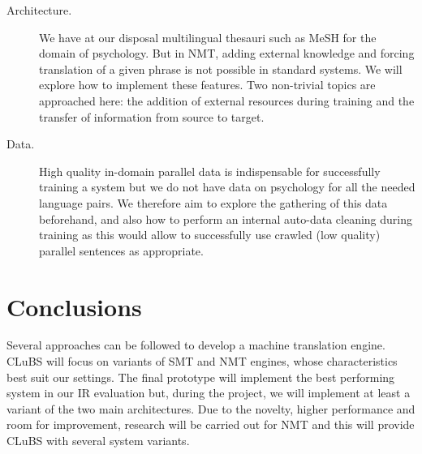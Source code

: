 \documentclass[a4paper,11pt]{article}
\begin{document}
\begin{description}
 \item[Architecture.] We have at our disposal multilingual thesauri such as MeSH for the domain of psychology. But in NMT, adding external knowledge and forcing translation of a given phrase is not possible in standard systems. We will explore how to implement these features. 
 Two non-trivial topics are approached here: the addition of external resources during training and the transfer of information from source to target.
 \item[Data.] High quality in-domain parallel data is indispensable for successfully training a system but we do not have data on psychology for all the needed language pairs. We therefore aim to explore the gathering of this data beforehand, and also how to perform an internal auto-data cleaning during training as this would allow to successfully use crawled (low quality) parallel sentences as appropriate.
\end{description}




\section{Conclusions}
\label{s:conclusions}

Several approaches can be followed to develop a machine translation engine. CLuBS will focus on variants of SMT and NMT engines, whose characteristics best suit our settings. The final prototype will implement the best performing system in our IR evaluation but, during the project, we will implement at least a variant of the two main architectures. Due to the novelty, higher performance and room for improvement, research will be carried out for NMT and this will provide CLuBS with several system variants.

%
%
% 
% 
\end{document}
